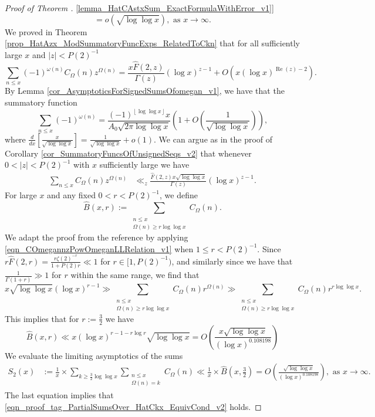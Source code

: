 \documentclass[11pt,reqno,a4letter]{article}
\newcommand{\hlocalref}[1]{\hyperref[#1]{\ref{#1}}}
\numberwithin{equation}{section}
\numberwithin{figure}{section}
\numberwithin{table}{section}
\newcommand{\cf}{\textit{cf.\ }}
\newcommand{\floor}[1]{\left\lfloor #1 \right\rfloor}
\theoremstyle{plain}
\numberwithin{theorem}{section}
\theoremstyle{definition}
\renewcommand{\Re}{\operatorname{Re}}
\begin{document}
\begin{proof}[Proof of Theorem \hlocalref{lemma_HatCAstxSum_ExactFormulaWithError_v1}]
\begin{equation}
     = o\left(\sqrt{\log\log x}\right), \text{ as } x \rightarrow \infty. 
\end{equation} 
We proved in Theorem \hlocalref{prop_HatAzx_ModSummatoryFuncExps_RelatedToCkn} 
that for all sufficiently large $x$ and $|z| < P(2)^{-1}$ 
\[
\sum_{n \leq x} (-1)^{\omega(n)} C_{\Omega}(n) z^{\Omega(n)} = 
     \frac{x \widehat{F}(2, z)}{\Gamma(z)} (\log x)^{z-1} + O\left( 
     x (\log x)^{\Re(z)-2}\right). 
\]
By Lemma \hlocalref{cor_AsymptoticsForSignedSumsOfomegan_v1}, 
we have that the summatory function 
\[
\sum_{n \leq x} (-1)^{\omega(n)} = 
     \frac{(-1)^{\floor{\log\log x}} x}{A_0 \sqrt{2\pi \log\log x}} 
     \left(1+O\left(\frac{1}{\sqrt{\log\log x}}\right)\right), 
\]
where $\frac{d}{dx}\left[\frac{x}{\sqrt{\log\log x}}\right] = \frac{1}{\sqrt{\log\log x}} + o(1)$. 
We can argue as in the proof of Corollary \hlocalref{cor_SummatoryFuncsOfUnsignedSeqs_v2} 
that whenever $0 < |z| < P(2)^{-1}$ with $x$ sufficiently large we have 
\begin{align}
\label{eqn_COmegannzPowOmeganLLRelation_v1} 
\sum_{n \leq x} C_{\Omega}(n) z^{\Omega(n)} & \ll_z 
     \frac{\widehat{F}(2, z) x \sqrt{\log\log x}}{\Gamma(z)} (\log x)^{z-1}. 
\end{align}
For large $x$ and any fixed $0 < r < P(2)^{-1}$, we define 
\[
\widehat{B}(x, r) := \sum_{\substack{n \leq x \\ \Omega(n) \geq r\log\log x}} 
     C_{\Omega}(n). 
\]
We adapt the proof from the reference \cite[\cf Thm.\ 7.20; \S 7.4]{MV} by 
applying \eqref{eqn_COmegannzPowOmeganLLRelation_v1} when $1 \leq r < P(2)^{-1}$. 
Since $r \widehat{F}(2, r) = \frac{r \zeta(2)^{-r}}{1+P(2)r} \ll 1$ 
for $r \in [1, P(2)^{-1})$, and similarly since we have that 
$\frac{1}{\Gamma(1+r)} \gg 1$ for $r$ within the same range, 
we find that 
\[
x \sqrt{\log\log x} (\log x)^{r-1} \gg \sum_{\substack{n \leq x \\ \Omega(n) \geq r\log\log x}} 
     C_{\Omega}(n) r^{\Omega(n)} \gg 
     \sum_{\substack{n \leq x \\ \Omega(n) \geq r\log\log x}} 
     C_{\Omega}(n) r^{r \log\log x}. 
\]
This implies that for $r := \frac{3}{2}$ we have 
\begin{equation}
\label{eqn_BHatxrUpperBound_v1}
\widehat{B}(x, r) \ll x (\log x)^{r-1-r\log r} \sqrt{\log\log x} = 
     O\left(\frac{x \sqrt{\log\log x}}{(\log x)^{0.108198}}\right)
\end{equation}
We evaluate the limiting asymptotics of the sums 
\begin{align*}
S_2(x) & := \frac{1}{x} \times 
     \sum_{k \geq \frac{3}{2} \log\log x} \sum_{\substack{n \leq x \\ \Omega(n)=k}} 
     C_{\Omega}(n) \ll \frac{1}{x} \times \widehat{B}\left(x, \frac{3}{2}\right) = 
     O\left(\frac{\sqrt{\log\log x}}{(\log x)^{0.108198}}\right), 
     \text{ as } x \rightarrow \infty. 
\end{align*} 
The last equation implies that 
\eqref{eqn_proof_tag_PartialSumsOver_HatCkx_EquivCond_v2} holds. 
\end{proof} 
\end{document}
